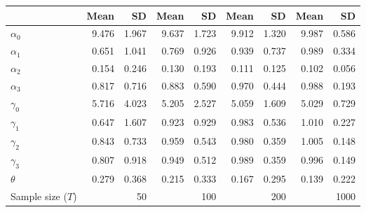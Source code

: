 
\begin{tabular}[t]{lrrrrrrrr}
\toprule
  & Mean & SD & Mean  & SD  & Mean   & SD   & Mean    & SD   \\
\midrule
$\alpha_{0}$ & 9.476 & 1.967 & 9.637 & 1.723 & 9.912 & 1.320 & 9.987 & 0.586\\
$\alpha_{1}$ & 0.651 & 1.041 & 0.769 & 0.926 & 0.939 & 0.737 & 0.989 & 0.334\\
$\alpha_{2}$ & 0.154 & 0.246 & 0.130 & 0.193 & 0.111 & 0.125 & 0.102 & 0.056\\
$\alpha_{3}$ & 0.817 & 0.716 & 0.883 & 0.590 & 0.970 & 0.444 & 0.988 & 0.193\\
$\gamma_{0}$ & 5.716 & 4.023 & 5.205 & 2.527 & 5.059 & 1.609 & 5.029 & 0.729\\
$\gamma_{1}$ & 0.647 & 1.607 & 0.923 & 0.929 & 0.983 & 0.536 & 1.010 & 0.227\\
$\gamma_{2}$ & 0.843 & 0.733 & 0.959 & 0.543 & 0.980 & 0.359 & 1.005 & 0.148\\
$\gamma_{3}$ & 0.807 & 0.918 & 0.949 & 0.512 & 0.989 & 0.359 & 0.996 & 0.149\\
$\theta$ & 0.279 & 0.368 & 0.215 & 0.333 & 0.167 & 0.295 & 0.139 & 0.222\\
Sample size ($T$) &  & 50 &  & 100 &  & 200 &  & 1000\\
\bottomrule
\end{tabular}
